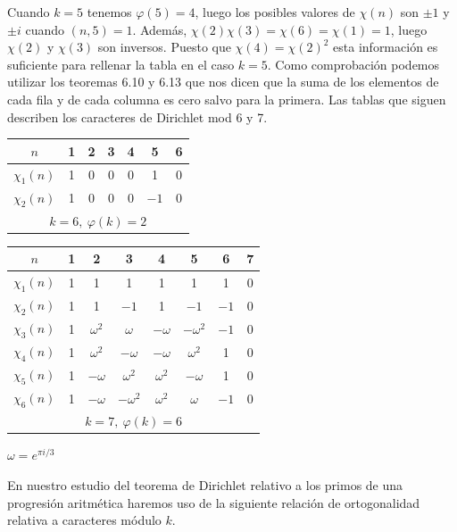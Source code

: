 \documentclass[12pt,a4paper]{book}
\begin{document}
\begin{ejemplo}
        Cuando $k=5$ tenemos $\varphi(5)=4$, luego los posibles valores de $\chi(n)$ son
        $\pm1$ y $\pm i$ cuando $(n,5)=1$. Además, $\chi(2)\chi(3)=\chi(6)=\chi(1)=1$, luego
        $\chi(2)$ y $\chi(3)$ son inversos. Puesto que $\chi(4)=\chi(2)^{2}$ esta información
        es suficiente para rellenar la tabla en el caso $k=5$. Como comprobación podemos
        utilizar los teoremas 6.10 y 6.13 que nos dicen que la suma de los elementos de
        cada fila y de cada columna es cero salvo para la primera. Las tablas que siguen
        describen los caracteres de Dirichlet mod 6 y 7.

        \begin{center}
            \small
            \begin{tabular}{c|cccccc}
                $n$&1&2&3&4&5&6\\\hline
                $\chi_{1}(n)$&1&0&0&0&1&0\\
                $\chi_{2}(n)$&1&0&0&0&$-1$&0\\
                \multicolumn{7}{c}{$k=6,\ \varphi(k)=2$}
            \end{tabular}
        \end{center}

        \begin{center}
            \small
            \begin{tabular}{c|ccccccc}
                $n$&1&2&3&4&5&6&7\\\hline
                $\chi_{1}(n)$&1&1&1&1&1&1&0\\
                $\chi_{2}(n)$&1&1&$-1$&1&$-1$&$-1$&0\\
                $\chi_{3}(n)$&1&$\omega^{2}$&$\omega$&$-\omega$&$-\omega^{2}$&$-1$&0\\
                $\chi_{4}(n)$&1&$\omega^{2}$&$-\omega$&$-\omega$&$\omega^{2}$&1&0\\
                $\chi_{5}(n)$&1&$-\omega$&$\omega^{2}$&$\omega^{2}$&$-\omega$&1&0\\
                $\chi_{6}(n)$&1&$-\omega$&$-\omega^{2}$&$\omega^{2}$&$\omega$&$-1$&0\\
                \multicolumn{8}{c}{$k=7,\ \varphi(k)=6$}
            \end{tabular}
            \qquad$\omega=e^{\pi i/3}$
        \end{center}
    \end{ejemplo}

    En nuestro estudio del teorema de Dirichlet relativo a los primos de una progresión
    aritmética haremos uso de la siguiente relación de ortogonalidad relativa a caracteres
    módulo $k$.
\end{document}
